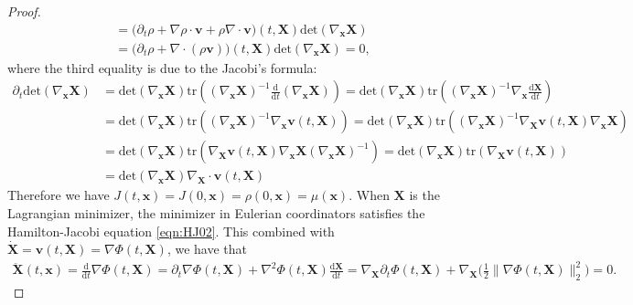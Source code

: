 \documentclass[11pt]{book}
\begin{document}
\begin{proof}
\begin{align*}
       & = \Big( \partial_t\rho + \nabla\rho\cdot\mathbf{v} + \rho\nabla\cdot\mathbf{v}  \Big)(t,\mathbf{X}) \mathrm{det}(\nabla_{\mathbf{x}}\mathbf{X}) \\
       & = \Big( \partial_t\rho + \nabla\cdot(\rho\mathbf{v}) \Big)(t,\mathbf{X}) \mathrm{det}(\nabla_{\mathbf{x}}\mathbf{X}) = 0,
    \end{align*}
    where the third equality is due to the Jacobi's formula:
    \begin{align*}
        \partial_t \mathrm{det}(\nabla_{\mathbf{x}}\mathbf{X}) & = \mathrm{det}(\nabla_{\mathbf{x}}\mathbf{X}) \mathrm{tr}\left( (\nabla_{\mathbf{x}}\mathbf{X})^{-1} \frac{\mathrm{d}}{\mathrm{d}t}(\nabla_{\mathbf{x}}\mathbf{X})  \right) = \mathrm{det}(\nabla_{\mathbf{x}}\mathbf{X}) \mathrm{tr}\left( (\nabla_{\mathbf{x}}\mathbf{X})^{-1} \nabla_{\mathbf{x}}\frac{\mathrm{d}\mathbf{X}}{\mathrm{d}t}  \right) \\
        & = \mathrm{det}(\nabla_{\mathbf{x}}\mathbf{X}) \mathrm{tr}\left( (\nabla_{\mathbf{x}}\mathbf{X})^{-1} \nabla_{\mathbf{x}}\mathbf{v}(t,\mathbf{X})  \right) = \mathrm{det}(\nabla_{\mathbf{x}}\mathbf{X}) \mathrm{tr}\left( (\nabla_{\mathbf{x}}\mathbf{X})^{-1} \nabla_{\mathbf{X}}\mathbf{v}(t,\mathbf{X}) \nabla_{\mathbf{x}}\mathbf{X}  \right) \\
        & = \mathrm{det}(\nabla_{\mathbf{x}}\mathbf{X}) \mathrm{tr}\left( \nabla_{\mathbf{X}}\mathbf{v}(t,\mathbf{X}) \nabla_{\mathbf{x}}\mathbf{X} (\nabla_{\mathbf{x}}\mathbf{X})^{-1} \right) = \mathrm{det}(\nabla_{\mathbf{x}}\mathbf{X}) \mathrm{tr}\left( \nabla_{\mathbf{X}}\mathbf{v}(t,\mathbf{X})  \right) \\
        & = \mathrm{det}(\nabla_{\mathbf{x}}\mathbf{X}) \nabla_{\mathbf{X}}\cdot\mathbf{v}(t,\mathbf{X})
    \end{align*}
    Therefore we have 
    $
        J(t,\mathbf{x}) = J(0,\mathbf{x}) = \rho(0,\mathbf{x}) = \mu(\mathbf{x}).
    $
    When $\mathbf{X}$ is the Lagrangian minimizer, the minimizer in Eulerian coordinators satisfies the Hamilton-Jacobi equation \eqref{eqn:HJ02}. This combined with $\dot{\mathbf{X}}=\mathbf{v}(t,\mathbf{X})=\nabla\Phi(t,\mathbf{X})$, we have that
    \begin{align*}
        \ddot{\mathbf{X}}(t,\mathbf{x}) = \frac{\mathrm{d}}{\mathrm{d}t}\nabla\Phi(t,\mathbf{X}) 
        = \partial_t \nabla\Phi(t,\mathbf{X}) + \nabla^2\Phi(t,\mathbf{X}) \frac{\mathrm{d}\mathbf{X}}{\mathrm{d}t} 
         = \nabla_{\mathbf{X}} \partial_t\Phi(t,\mathbf{X}) + \nabla_{\mathbf{X}}\Big( \frac{1}{2}\| \nabla\Phi(t,\mathbf{X}) \|_2^2 \Big) = 0.

\end{align*}
\end{proof}
\end{document}
